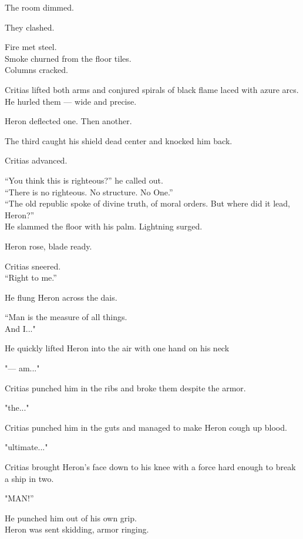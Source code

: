 \documentclass[9pt]{article}
\begin{document}
The room dimmed.

\vspace{1em}

They clashed.

Fire met steel.\\
Smoke churned from the floor tiles.\\
Columns cracked.

Critias lifted both arms and conjured spirals of black flame laced with azure arcs.\\
He hurled them — wide and precise.

Heron deflected one. Then another.

The third caught his shield dead center and knocked him back.

\vspace{1em}

Critias advanced.

“You think this is righteous?” he called out.\\
“There is no righteous. No structure. No One.”\\
“The old republic spoke of divine truth, of moral orders. But where did it lead, Heron?”\\
He slammed the floor with his palm. Lightning surged.

Heron rose, blade ready.

Critias sneered.\\
“Right to me.”

He flung Heron across the dais.

“Man is the measure of all things.\\
And I..."

He quickly lifted Heron into the air with one hand on his neck

"— am..."

Critias punched him in the ribs and broke them despite the armor.

"the..."

Critias punched him in the guts and managed to make Heron cough up blood.


"ultimate..."

Critias brought Heron's face down to his knee with a force hard enough to break a ship in two.

"MAN!”

He punched him out of his own grip.\\

Heron was sent skidding, armor ringing.

\vspace{1em}
\end{document}
